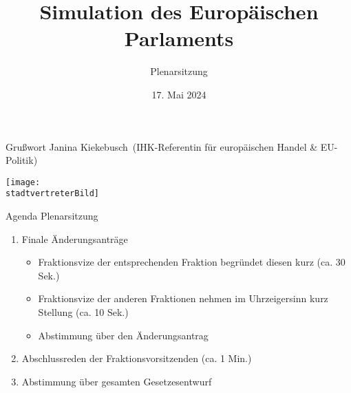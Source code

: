 \documentclass{beamer}
\date{17. Mai 2024}%
\title{Simulation des Europäischen Parlaments}
\subtitle{Plenarsitzung}
\newcommand{\city}{Bayreuth}
\newcommand{\stadtvertreter}{Janina Kiekebusch}%
\newcommand{\office}{IHK-Referentin für europäischen Handel \& EU-Politik}%
\newcommand{\stadtvertreterBild}{Bilder/kikebusch.png}%
\begin{document}
\frame{\titlepage}

\begin{frame}{Grußwort \stadtvertreter\ (\office)}
\vspace{-1.5cm}
    \begin{center}
        \texttt{[image: \\stadtvertreterBild]}
    \end{center}
\end{frame}

\begin{frame}{Agenda Plenarsitzung}
\vspace{-1.5cm}
    \begin{enumerate}
        \item Finale Änderungsanträge
        \begin{itemize}
            \item Fraktionsvize der entsprechenden Fraktion begründet diesen kurz (ca. 30 Sek.)
            \item Fraktionsvize der anderen Fraktionen nehmen im Uhrzeigersinn kurz Stellung (ca. 10 Sek.)
            \item Abstimmung über den Änderungsantrag
        \end{itemize}
        \item Abschlussreden der Fraktionsvorsitzenden (ca. 1 Min.)
        \item Abstimmung über gesamten Gesetzesentwurf
    \end{enumerate}
\end{frame}

\begin{comment}
\begin{frame}{JEF \city}
\vspace{-0.5cm} 
\hspace{0.1cm} Nächstes Treffen: Europapicknick 04.06. 18:00
\newline
\center
\texttt{[image: \\qrinsta]}
\end{frame}
\end{comment}
\end{document}
